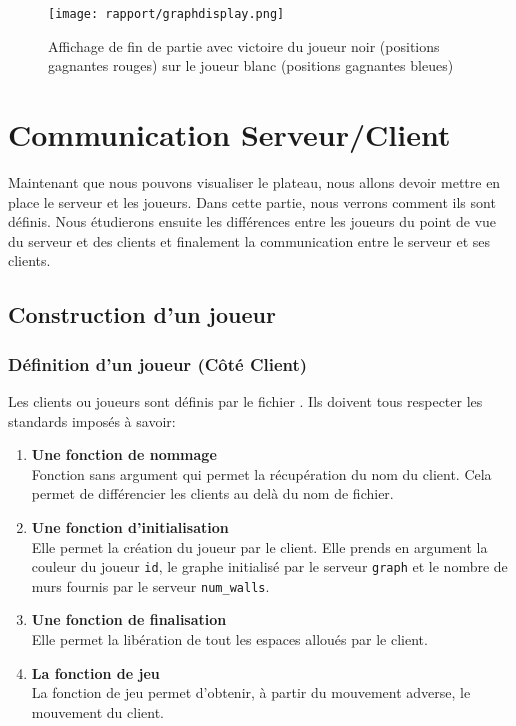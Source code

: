 \documentclass[a4paper]{article}
\begin{document}
\begin{figure}
    \centering
    \texttt{[image: rapport/graphdisplay.png]}
    \caption{Affichage de fin de partie avec victoire du joueur noir (positions gagnantes rouges) sur le joueur blanc (positions gagnantes bleues)}
    \label{fig:graphdisplay}
\end{figure}

\clearpage
\section{Communication Serveur/Client}

Maintenant que nous pouvons visualiser le plateau, nous allons devoir mettre en place le serveur et les joueurs.
Dans cette partie, nous verrons comment ils sont définis. Nous étudierons ensuite les différences entre les joueurs du point de vue du serveur et des clients et finalement la communication entre le serveur et ses clients.

\subsection{Construction d'un joueur}

\subsubsection{Définition d'un joueur (Côté Client)}

Les clients ou joueurs sont définis par le fichier . Ils doivent tous respecter les standards imposés à savoir: \\

\begin{enumerate}
    \item \textbf{Une fonction de nommage} \\
Fonction sans argument qui permet la récupération du nom du client. Cela permet de différencier les clients au delà du nom de fichier.
    \item \textbf{Une fonction d'initialisation} \\
Elle permet la création du joueur par le client. Elle prends en argument la couleur du joueur \texttt{id}, le graphe initialisé par le serveur \texttt{graph} et le nombre de murs fournis par le serveur \texttt{num\_walls}.
    \item \textbf{Une fonction de finalisation} \\
Elle permet la libération de tout les espaces alloués par le client.
    \item \textbf{La fonction de jeu} \\
La fonction de jeu permet d'obtenir, à partir du mouvement adverse, le mouvement du client. \\
\end{enumerate}
\end{document}
